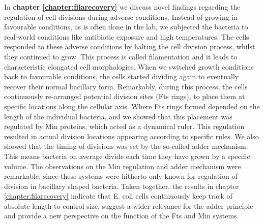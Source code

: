 In \textbf{chapter \ref{chapter:filarecovery}} we discuss 
novel findings regarding 
the regulation of cell divisions during adverse conditions.
%
Instead of growing \ecoli in favourable conditions, as is often done in the lab, we subjected the bacteria to 
real-world conditions like antibiotic exposure and high temperatures.
%
The cells responded to these adverse conditions by halting the cell division process, whilst they continued to grow.
This process is called filamentation and it leads to characteristic elongated cell morphologies.
%
%
When we switched growth conditions back to favourable conditions,
the cells started dividing again to eventually recover their normal bacillary form. %
%
Remarkably, during this process,
the cells continuously re-arranged potential division sites (Fts rings), 
to place them at specific locations along the cellular axis. %
%
Where Fts rings formed depended on the length of the individual bacteria,
and we showed that this placement was regulated by Min proteins, which acted as a dynamical ruler.
%
This regulation resulted in actual division locations appearing according to specific rules.
%
We also showed that the timing of divisions was set by the so-called adder mechanism.
This means bacteria on average divide each time they have grown by a specific volume.
%
The observations on the Min regulation and adder mechanism were remarkable,
since these systems were hitherto only known for regulation of division in bacillary shaped bacteria.
%
Taken together, the results in chapter \ref{chapter:filarecovery} indicate that E. coli cells continuously keep track of absolute length to control size, 
suggest a wider relevance for the adder principle 
and provide a new perspective on the function of the Fts and Min systems.



